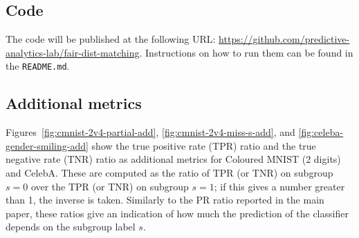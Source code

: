 \subsection{Code}
The code will be published at the following URL: \url{https://github.com/predictive-analytics-lab/fair-dist-matching}.
Instructions on how to run them can be found in the \texttt{README.md}.

\subsection{Additional metrics}
Figures~\ref{fig:cmnist-2v4-partial-add}, \ref{fig:cmnist-2v4-miss-s-add},  and \ref{fig:celeba-gender-smiling-add} show the true positive rate (TPR) ratio and the true negative rate (TNR) ratio as additional metrics for Coloured MNIST (2 digits) and CelebA.
These are computed as the ratio of TPR (or TNR) on subgroup $s=0$ over the TPR (or TNR) on subgroup $s=1$; if this gives a number greater than 1, the inverse is taken.
Similarly to the PR ratio reported in the main paper, these ratios give an indication of how much the prediction of the classifier depends on the subgroup label $s$.

